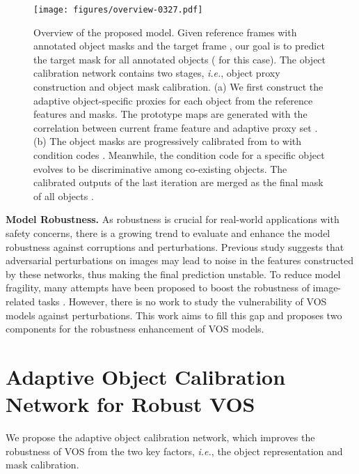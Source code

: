 \documentclass[sigconf]{acmart}
\begin{document}
\begin{figure*}[t]
	\centering
	\texttt{[image: figures/overview-0327.pdf]} 
	\caption{{Overview of the proposed model.} Given reference frames  with annotated object masks  and the target frame , our goal is to predict the target mask  for all annotated objects ( for this case). The object calibration network contains two stages, \textit{i.e.}, object proxy construction and object mask calibration.
	(a) We first construct the adaptive object-specific proxies  for each object  from the reference features and masks. 
	The prototype maps  are generated with the correlation between current frame feature and adaptive proxy set . 
    (b) The object masks are progressively calibrated from  to  with condition codes . Meanwhile, the condition code for a specific object evolves to be discriminative among co-existing objects. The calibrated outputs of the last iteration are merged as the final mask of all objects . 
	}
	\label{fig:PIPELINE}
\end{figure*}

    
\noindent\textbf{Model Robustness.} As robustness is crucial for real-world applications with safety concerns, there is a growing trend \cite{classification-robust,detection-robust, Segmentation-robust,10.1145/3474085.3475324,hendrycks2019benchmarking,kamann2020benchmarking} to evaluate and enhance the model robustness against corruptions and perturbations. Previous study \cite{xie2019feature} suggests that adversarial perturbations on images may lead to noise in the features constructed by these networks, thus making the final prediction unstable. To reduce model fragility, many attempts have been proposed to boost the robustness of image-related tasks \cite{robust_classification, robust_HOI}.  However, there is no work to study the vulnerability of VOS models against perturbations. This work aims to fill this gap and proposes two components for the robustness enhancement of VOS models.
 \section{Adaptive Object Calibration Network for Robust VOS}
We propose the adaptive object calibration network, which improves the robustness of VOS from the two key factors, \textit{i.e.}, the object representation and mask calibration.
      
\end{document}
